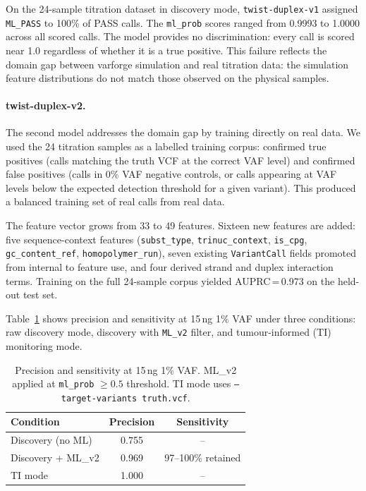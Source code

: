 On the 24-sample titration dataset in discovery mode, \texttt{twist-duplex-v1}
assigned \texttt{ML\_PASS} to 100\% of PASS calls.
The \texttt{ml\_prob} scores ranged from 0.9993 to 1.0000 across all scored calls.
The model provides no discrimination: every call is scored near 1.0 regardless of
whether it is a true positive.
This failure reflects the domain gap between varforge simulation and real titration
data: the simulation feature distributions do not match those observed on the
physical samples.

\paragraph{twist-duplex-v2.}
The second model addresses the domain gap by training directly on real data.
We used the 24 titration samples as a labelled training corpus: confirmed true
positives (calls matching the truth VCF at the correct VAF level) and confirmed
false positives (calls in 0\% VAF negative controls, or calls appearing at VAF
levels below the expected detection threshold for a given variant).
This produced a balanced training set of real calls from real data.

The feature vector grows from 33 to 49 features.
Sixteen new features are added: five sequence-context features
(\texttt{subst\_type}, \texttt{trinuc\_context}, \texttt{is\_cpg},
\texttt{gc\_content\_ref}, \texttt{homopolymer\_run}), seven existing
\texttt{VariantCall} fields promoted from internal to feature use, and four
derived strand and duplex interaction terms.
Training on the full 24-sample corpus yielded AUPRC\,=\,0.973 on the held-out
test set.

Table~\ref{tab:ml-v2} shows precision and sensitivity at 15\,ng 1\% VAF under
three conditions: raw discovery mode, discovery with \texttt{ML\_v2} filter, and
tumour-informed (TI) monitoring mode.

\begin{table}[h]
  \centering
  \caption{Precision and sensitivity at 15\,ng 1\% VAF. ML\_v2 applied at
    \texttt{ml\_prob} $\ge 0.5$ threshold. TI mode uses
    \texttt{--target-variants truth.vcf}.}
  \label{tab:ml-v2}
  \small
  \begin{tabular}{lcc}
    \toprule
    Condition & Precision & Sensitivity \\
    \midrule
    Discovery (no ML) & 0.755 & -- \\
    Discovery + ML\_v2 & 0.969 & 97--100\% retained \\
    TI mode            & 1.000 & -- \\
    \bottomrule
  \end{tabular}
\end{table}

